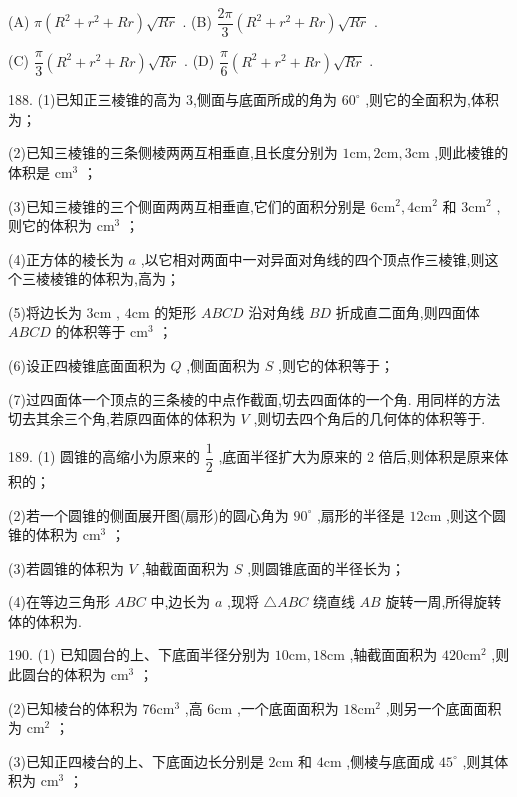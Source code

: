 (A) $\pi \left( {{R}^{2} + {r}^{2} + {Rr}}\right) \sqrt{Rr}$ . (B) $\dfrac{2\pi }{3}\left( {{R}^{2} + {r}^{2} + {Rr}}\right) \sqrt{Rr}$ .

(C) $\dfrac{\pi }{3}\left( {{R}^{2} + {r}^{2} + {Rr}}\right) \sqrt{Rr}$ . (D) $\dfrac{\pi }{6}\left( {{R}^{2} + {r}^{2} + {Rr}}\right) \sqrt{Rr}$ .

188. (1)已知正三棱锥的高为 3,侧面与底面所成的角为 ${60}^{ \circ  }$ ,则它的全面积为\blkda{},体积为\blkda{}；

(2)已知三棱锥的三条侧棱两两互相垂直,且长度分别为 $1\mathrm{{cm}},2\mathrm{{cm}},3\mathrm{{cm}}$ ,则此棱锥的体积是\blkda{} ${\mathrm{{cm}}}^{3}$ ；

(3)已知三棱锥的三个侧面两两互相垂直,它们的面积分别是 $6{\mathrm{{cm}}}^{2},4{\mathrm{{cm}}}^{2}$ 和 $3{\mathrm{{cm}}}^{2}$ ,则它的体积为\blkda{} ${\mathrm{{cm}}}^{3}$ ；

(4)正方体的棱长为 $a$ ,以它相对两面中一对异面对角线的四个顶点作三棱锥,则这个三棱棱锥的体积为\blkda{},高为\blkda{}；

(5)将边长为 $3\mathrm{{cm}}$ , $4\mathrm{{cm}}$ 的矩形 ${ABCD}$ 沿对角线 ${BD}$ 折成直二面角,则四面体 ${ABCD}$ 的体积等于\blkda{} ${\mathrm{{cm}}}^{3}$ ；

(6)设正四棱锥底面面积为 $Q$ ,侧面面积为 $S$ ,则它的体积等于\blkda{}；

(7)过四面体一个顶点的三条棱的中点作截面,切去四面体的一个角. 用同样的方法切去其余三个角,若原四面体的体积为 $V$ ,则切去四个角后的几何体的体积等于\blkda{}.

189. (1) 圆锥的高缩小为原来的 $\dfrac{1}{2}$ ,底面半径扩大为原来的 2 倍后,则体积是原来体积的\blkda{}；

(2)若一个圆锥的侧面展开图(扇形)的圆心角为 ${90}^{ \circ  }$ ,扇形的半径是 ${12}\mathrm{{cm}}$ ,则这个圆锥的体积为\blkda{} ${\mathrm{{cm}}}^{3}$ ；

(3)若圆锥的体积为 $V$ ,轴截面面积为 $S$ ,则圆锥底面的半径长为\blkda{}；

(4)在等边三角形 ${ABC}$ 中,边长为 $a$ ,现将 $\bigtriangleup {ABC}$ 绕直线 ${AB}$ 旋转一周,所得旋转体的体积为\blkda{}.

190. (1) 已知圆台的上、下底面半径分别为 ${10}\mathrm{{cm}},{18}\mathrm{{cm}}$ ,轴截面面积为 ${420}{\mathrm{{cm}}}^{2}$ ,则此圆台的体积为\blkda{} ${\mathrm{{cm}}}^{3}$ ；

(2)已知棱台的体积为 ${76}{\mathrm{{cm}}}^{3}$ ,高 $6\mathrm{{cm}}$ ,一个底面面积为 ${18}{\mathrm{{cm}}}^{2}$ ,则另一个底面面积为\blkda{} ${\mathrm{{cm}}}^{2}$ ；

(3)已知正四棱台的上、下底面边长分别是 $2\mathrm{{cm}}$ 和 $4\mathrm{{cm}}$ ,侧棱与底面成 ${45}^{ \circ  }$ ,则其体积为\blkda{} ${\mathrm{{cm}}}^{3}$ ；

